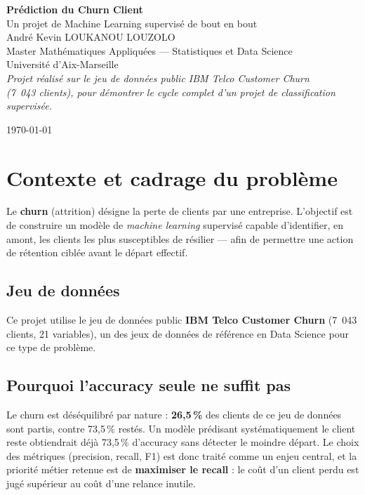 \documentclass[11pt,a4paper]{article}
\begin{document}
\begin{titlepage}
\centering
\vspace*{2cm}
{\Huge\bfseries\color{teal} Prédiction du Churn Client}\\[8pt]
{\Large\color{dark} Un projet de Machine Learning supervisé de bout en bout}\\[40pt]

{\large André Kevin LOUKANOU LOUZOLO}\\[4pt]
{\color{gray} Master Mathématiques Appliquées — Statistiques et Data Science}\\
{\color{gray} Université d'Aix-Marseille}\\[40pt]

\vspace{2cm}
{\color{dark}\textit{Projet réalisé sur le jeu de données public IBM Telco Customer Churn\\
(7~043 clients), pour démontrer le cycle complet d'un projet de classification supervisée.}}

\vfill
{\small\color{gray} \today}
\end{titlepage}

\tableofcontents
\newpage

\section{Contexte et cadrage du problème}

Le \textbf{churn} (attrition) désigne la perte de clients par une entreprise. L'objectif est de construire un modèle de \textit{machine learning} supervisé capable d'identifier, en amont, les clients les plus susceptibles de résilier — afin de permettre une action de rétention ciblée avant le départ effectif.

\subsection{Jeu de données}
Ce projet utilise le jeu de données public \textbf{IBM Telco Customer Churn} (7~043 clients, 21 variables), un des jeux de données de référence en Data Science pour ce type de problème.

\subsection{Pourquoi l'accuracy seule ne suffit pas}
Le churn est déséquilibré par nature : \textbf{26,5\,\%} des clients de ce jeu de données sont partis, contre 73,5\,\% restés. Un modèle prédisant systématiquement \og le client reste \fg{} obtiendrait déjà 73,5\,\% d'accuracy sans détecter le moindre départ. Le choix des métriques (precision, recall, F1) est donc traité comme un enjeu central, et la priorité métier retenue est de \textbf{maximiser le recall} : le coût d'un client perdu est jugé supérieur au coût d'une relance inutile.
\end{document}
